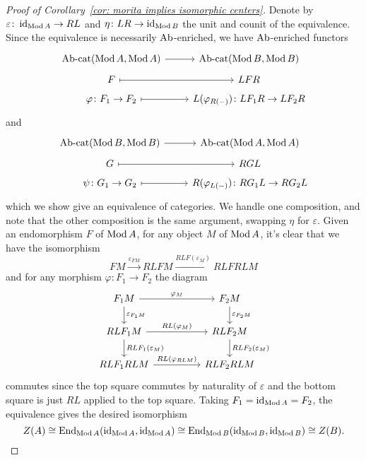 \documentclass[reqno, 12pt]{amsart}
\begin{document}
\begin{proof}[Proof of Corollary~\ref{cor: morita implies isomorphic centers}]
  Denote by $\varepsilon \colon \operatorname{id}_{\operatorname{Mod}A} \to RL$ and $\eta \colon LR \to \operatorname{id}_{\operatorname{Mod}B}$ the unit and counit of the equivalence.
  Since the equivalence is necessarily $\operatorname{Ab}$-enriched, we have $\operatorname{Ab}$-enriched functors
  $$\begin{tikzcd}[row sep=tiny]
    \Abcat(\Mod{A},\Mod{A}) \arrow{r} & \Abcat(\Mod{B},\Mod{B})\\
    F \arrow[mapsto]{r} & LFR\\
    \varphi \colon F_1 \to F_2 \arrow[mapsto]{r} & L(\varphi_{R(-)}) \colon LF_1R \to LF_2R
  \end{tikzcd}$$
  and
  $$\begin{tikzcd}[row sep=tiny]
    \Abcat(\Mod{B},\Mod{B}) \arrow{r} & \Abcat(\Mod{A},\Mod{A})\\
    G \arrow[mapsto]{r} & RGL\\
    \psi \colon G_1 \to G_2 \arrow[mapsto]{r} & R(\varphi_{L(-)}) \colon RG_1L \to RG_2L
  \end{tikzcd}$$
  which we show give an equivalence of categories.
  We handle one composition, and note that the other composition is the same argument, swapping $\eta$ for $\varepsilon$.
  Given an endomorphism $F$ of $\operatorname{Mod}A$, for any object $M$ of $\operatorname{Mod}A$, it's clear that we have the isomorphism
  $$FM \overset{\varepsilon_{FM}}\longrightarrow RLFM \overset{RLF(\varepsilon_M)}\longrightarrow RLFRLM$$
  and for any morphism $\varphi \colon F_1 \to F_2$ the diagram
  $$\begin{tikzcd}[column sep=huge]
    F_1M \arrow{d}{\varepsilon_{F_1M}}\arrow{r}{\varphi_M} & F_2M\arrow{d}{\varepsilon_{F_2M}}\\
    RLF_1M \arrow{d}{RLF_1(\varepsilon_{M})}\arrow{r}{RL(\varphi_M)} & RLF_2M\arrow{d}{RLF_2(\varepsilon_M)}\\
    RLF_1RLM \arrow{r}{RL(\varphi_{RLM})} & RLF_2RLM
  \end{tikzcd}$$
  commutes since the top square commutes by naturality of $\varepsilon$ and the bottom square is just $RL$ applied to the top square.
  Taking $F_1 = \operatorname{id}_{\operatorname{Mod}A} = F_2$, the equivalence gives the desired isomorphism
  $$Z(A) \cong \operatorname{End}_{\operatorname{Mod}A}(\operatorname{id}_{\operatorname{Mod}A}, \operatorname{id}_{\operatorname{Mod}A}) \cong \operatorname{End}_{\operatorname{Mod}B}(\operatorname{id}_{\operatorname{Mod}B},\operatorname{id}_{\operatorname{Mod}B}) \cong Z(B).$$
\end{proof}
\end{document}
